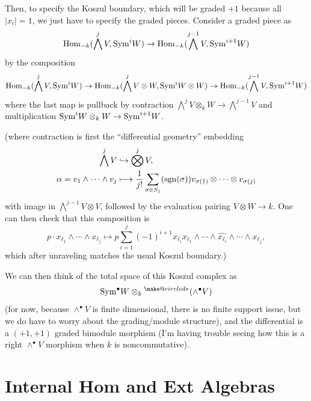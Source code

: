 \documentclass[12pt]{article}
\makeatletter
\newcommand{\ostar}{{\mathbin{\mathpalette\make@circled{*}}}}
\newcommand{\make@circled}[2]{%
  \ooalign{$\m@th#1\smallbigcirc{#1}$\cr\hidewidth$\m@th#1#2$\hidewidth\cr}%
}
\newcommand{\smallbigcirc}[1]{%
  \vcenter{\hbox{\scalebox{0.7}{$\m@th#1\bigcirc$}}}%
}
\makeatother
\begin{document}




Then, to specify the Koszul boundary, which will be graded $+1$ because all $|x_i|=1$, we just have to specify the graded pieces. Consider a graded piece as
\[\mathrm{Hom}_{-k}(\bigwedge^j V, \mathrm{Sym}^i W) \to \mathrm{Hom}_{-k}(\bigwedge^{j-1} V, \mathrm{Sym}^{i+1} W)\]
by the composition
\[\mathrm{Hom}_{-k}(\bigwedge^j V, \mathrm{Sym}^i W) \to \mathrm{Hom}_{-k}(\bigwedge^j V \otimes W, \mathrm{Sym}^i W \otimes W) \to \mathrm{Hom}_{-k}(\bigwedge^{j-1} V, \mathrm{Sym}^{i+1} W)\]
where the last map is pullback by contraction $\bigwedge^{j} V \otimes_k W \to \bigwedge^{j-1} V$ and multiplication $\mathrm{Sym}^{i} W \otimes_k W \to \mathrm{Sym}^{i+1} W$.

(where contraction is first the ``differential geometry'' embedding
\begin{align*}
    \bigwedge^j V &\hookrightarrow \bigotimes^j V,\\
    \alpha = v_1\wedge \cdots \wedge v_j &\longmapsto \frac{1}{j!} \sum_{\sigma \in S_j} (\mathrm{sgn}(\sigma)) v_{\sigma(1)} \otimes \cdots \otimes v_{\sigma(j)}
\end{align*}
with image in $\bigwedge^{j-1} V \otimes V$, followed by the evaluation pairing $V\otimes W\to k$. One can then check that this composition is
\[p \cdot x_{\ell_1}\wedge \cdots \wedge x_{\ell_j} \longmapsto p\sum_{i=1}^j (-1)^{i+1} x_{\ell_i} x_{\ell_1}\wedge \cdots \wedge \hat{x_{\ell_i}} \wedge \cdots \wedge x_{\ell_j},\]
which after unraveling matches the usual Koszul boundary.)

We can then think of the total space of this Koszul complex as
\[\Sym^\bullet W \otimes_k {}^\ostar (\wedge^\bullet V)\]
(for now, because $\wedge^\bullet V$ is finite dimensional, there is no finite support issue, but we do have to worry about the grading/module structure), and the differential is a $(+1,+1)$ graded bimodule morphism (I'm having trouble seeing how this is a right $\wedge^\bullet V$ morphism when $k$ is noncommutative).








\section{Internal Hom and Ext Algebras}
\end{document}
